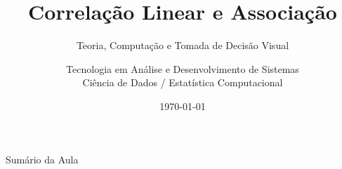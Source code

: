 \documentclass[10pt]{beamer}
\title[ADS - Aula 13]{Correlação Linear e Associação}
\subtitle{Teoria, Computação e Tomada de Decisão Visual}
\author[ADS - IFCE]{Tecnologia em Análise e Desenvolvimento de Sistemas\texorpdfstring{\\ \small{Ciência de Dados / Estatística Computacional}}{}}
\institute[IFCE]{Instituto Federal do Ceará -- Campus Tauá}
\date{\today}
\begin{document}
\begin{frame}
    \titlepage
\end{frame}

\begin{frame}{Sumário da Aula}
    \tableofcontents
\end{frame}



\end{document}
